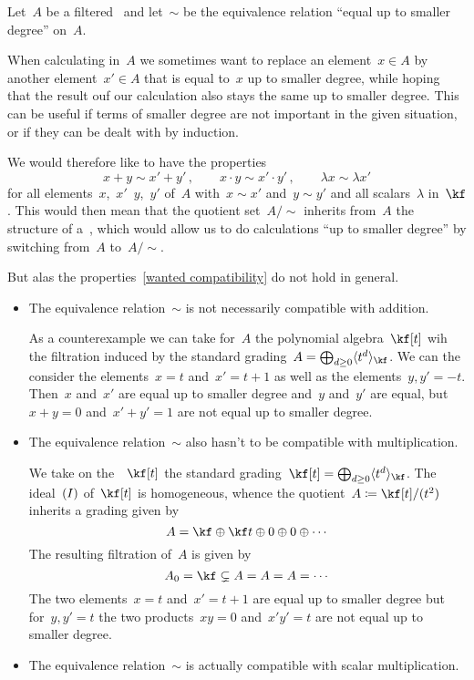 \begin{fluff}
  Let~$A$ be a filtered~{\algebra{$\kf$}} and let~$\sim$ be the equivalence relation \enquote{equal up to smaller degree} on~$A$.
  
  When calculating in~$A$ we sometimes want to replace an element~$x \in A$ by another element~$x' \in A$ that is equal to~$x$ up to smaller degree, while hoping that the result ouf our calculation also stays the same up to smaller degree.
  This can be useful if terms of smaller degree are not important in the given situation, or if they can be dealt with by induction.
  
  We would therefore like to have the properties
  \begin{equation}
    \label{wanted compatibility}
    x + y
    \sim
    x' + y' \,,
    \qquad
    x \cdot y
    \sim
    x' \cdot y' \,,
    \qquad
    \lambda x \sim \lambda x'
  \end{equation}
  for all elements~$x$,~$x'$~$y$,~$y'$ of~$A$ with~$x \sim x'$ and~$y \sim y'$ and all scalars~$\lambda$ in~$\kf$.
  This would then mean that the quotient set~$A/{\sim}$ inherits from~$A$ the structure of a~{\algebra{$\kf$}}, which would allow us to do calculations \enquote{up to smaller degree} by switching from~$A$ to~$A/{\sim}$.
  
  But alas the properties~\eqref{wanted compatibility} do not hold in general.%
  \begin{itemize}
    \item
      The equivalence relation~$\sim$ is not necessarily compatible with addition.

      As a counterexample we can take for~$A$ the polynomial algebra~$\kf[t]$ wih the filtration induced by the standard grading~$A = \bigoplus_{d \geq 0} \gen{ t^d }_{\kf}$.
      We can the consider the elements~$x = t$ and~$x' = t+1$ as well as the elements~$y, y' = -t$.
      Then~$x$ and~$x'$ are equal up to smaller degree and~$y$ and~$y'$ are equal, but~$x + y = 0$ and~$x' + y' = 1$ are not equal up to smaller degree.
    \item
      The equivalence relation~$\sim$ also hasn’t to be compatible with multiplication.
      
      We take on the~\algebra{$\kf$}~$\kf[t]$ the standard grading~$\kf[t] = \bigoplus_{d \geq 0} \gen{ t^d }_{\kf}$.
      The ideal~$\lparen I\rparen$ of~$\kf[t]$ is homogeneous, whence the quotient~$A \defined \kf[t] / \ideal{ t^2 }$ inherits a grading given by
      \[
        A
        =
        \kf
        \oplus
        \kf t
        \oplus
        0
        \oplus
        0
        \oplus
        \dotsb
      \]
      The resulting filtration of~$A$ is given by
      \[
        A_0
        =
        \kf
        \subsetneq
        A
        =
        A
        =
        A
        =
        \dotsb
      \]
      The two elements~$x = t$ and~$x' = t+1$ are equal up to smaller degree but for~$y, y' = t$ the two products~$xy = 0$ and~$x' y' = t$ are not equal up to smaller degree.
    \item
      The equivalence relation~$\sim$ is actually compatible with scalar multiplication.


\end{itemize}
\end{fluff}
